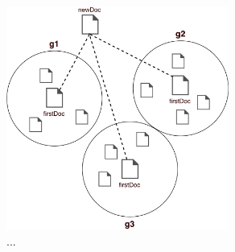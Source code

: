 	\begin{figure}[ht]
		\begin{center}
			\includegraphics[width=0.65\textwidth]{Clustering_NER2.pdf}
			\caption{...}
		\end{center}
	\end{figure}
	
